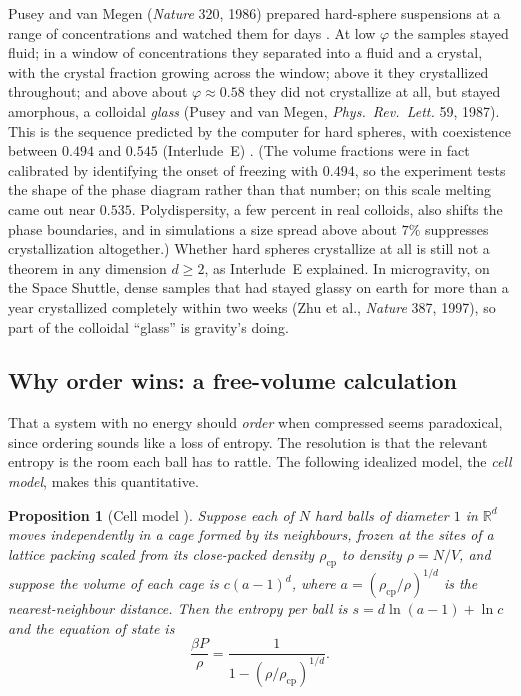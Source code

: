 \documentclass[11pt,openany]{book}
\theoremstyle{plain}
\newtheorem{proposition}[theorem]{Proposition}
\theoremstyle{definition}
\theoremstyle{remark}
\newcommand{\R}{\mathbb{R}}
\begin{document}
Pusey and van Megen (\emph{Nature} 320, 1986) prepared hard-sphere suspensions at a range of
concentrations and watched them for days . At low $\varphi$ the samples stayed fluid;
in a window of concentrations they separated into a fluid and a crystal, with the crystal fraction
growing across the window; above it they crystallized throughout; and above about $\varphi\approx0.58$ they
did not crystallize at all, but stayed amorphous, a colloidal \emph{glass} (Pusey and van Megen,
\emph{Phys.\ Rev.\ Lett.} 59, 1987). This is the sequence predicted by the computer for hard spheres, with coexistence between
$0.494$ and $0.545$ (Interlude~E) . (The volume fractions were in fact
calibrated by identifying the onset of freezing with $0.494$, so the experiment tests the shape of the
phase diagram rather than that number; on this scale melting came out near $0.535$. Polydispersity, a few
percent in real colloids, also shifts the phase boundaries, and in simulations a size spread above about
$7\%$ suppresses crystallization altogether.) Whether hard spheres crystallize at all is still not a theorem in any dimension
$d\ge2$, as Interlude~E explained. In microgravity, on the Space Shuttle, dense samples that had stayed glassy on
earth for more than a year crystallized completely within two weeks (Zhu et al., \emph{Nature} 387,
1997), so part of the colloidal ``glass'' is gravity's doing.

\subsection*{Why order wins: a free-volume calculation}
That a system with no energy should \emph{order} when compressed seems paradoxical, since ordering
sounds like a loss of entropy. The resolution is that the relevant entropy is the room each ball has to
rattle. The following idealized model, the \emph{cell model}, makes this quantitative.

\begin{proposition}[Cell model ]\label{PHYS:prop:cell}
Suppose each of $N$ hard balls of diameter $1$ in $\R^d$ moves independently in a cage formed by its
neighbours, frozen at the sites of a lattice packing scaled from its close-packed density $\rho_{\mathrm{cp}}$
to density $\rho=N/V$, and suppose the volume of each cage is $c(a-1)^d$, where
$a=(\rho_{\mathrm{cp}}/\rho)^{1/d}$ is the nearest-neighbour distance. Then the entropy per ball is
$s=d\ln(a-1)+\ln c$ and the equation of state is
\[
  \frac{\beta P}{\rho}=\frac1{1-(\rho/\rho_{\mathrm{cp}})^{1/d}} .
\]
\end{proposition}
\end{document}
